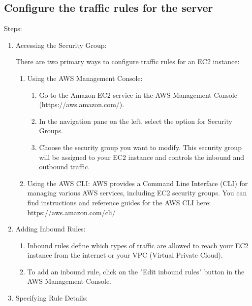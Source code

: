 \documentclass[11pt]{article}
\begin{document}
\subsection{Configure the traffic rules for the server}

Steps:
\begin{enumerate}
    \item Accessing the Security Group:

          There are two primary ways to configure traffic rules for an EC2 instance:
          \begin{enumerate}
              \item Using the AWS Management Console:
                    \begin{enumerate}
                        \item Go to the Amazon EC2 service in the AWS Management Console (https://aws.amazon.com/).
                        \item In the navigation pane on the left, select the option for Security Groups.
                        \item Choose the security group you want to modify. This security group will be assigned to your EC2 instance and controls the inbound and outbound traffic.
                    \end{enumerate}
              \item Using the AWS CLI:
                    AWS provides a Command Line Interface (CLI) for managing various AWS services, including EC2 security groups. You can find instructions and reference guides for the AWS CLI here: https://aws.amazon.com/cli/
          \end{enumerate}

    \item Adding Inbound Rules:
          \begin{enumerate}
              \item Inbound rules define which types of traffic are allowed to reach your EC2 instance from the internet or your VPC (Virtual Private Cloud).
              \item To add an inbound rule, click on the "Edit inbound rules" button in the AWS Management Console.
          \end{enumerate}

    \item Specifying Rule Details:


\end{enumerate}
\end{document}

